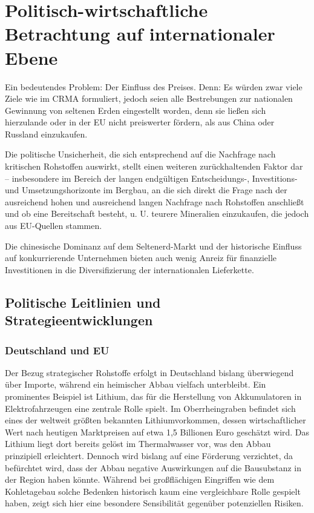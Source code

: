 \documentclass[12pt,a4paper,oneside]{book} %
\begin{document}

\chapter{Politisch-wirtschaftliche Betrachtung auf internationaler Ebene}


Ein bedeutendes Problem: Der Einfluss des Preises. Denn: Es würden zwar viele Ziele wie im CRMA formuliert, jedoch seien alle Bestrebungen zur nationalen Gewinnung von seltenen Erden eingestellt worden, denn sie ließen sich \glqq hierzulande oder in der EU nicht preiswerter fördern, als aus China oder Russland einzukaufen\grqq.\autocite{VDI Nachrichten: Seltene Erden: Deutschland importiert lieber, als selbst zu fördern}

Die politische Unsicherheit, die sich entsprechend auf die Nachfrage nach kritischen Rohstoffen auswirkt, stellt einen weiteren zurückhaltenden Faktor dar -- insbesondere im Bereich der langen endgültigen Entscheidungs-, Investitions- und Umsetzungshorizonte im Bergbau, an die sich direkt die Frage nach der ausreichend hohen und ausreichend langen Nachfrage nach Rohstoffen anschließt und ob eine Bereitschaft besteht, u. U. teurere Mineralien einzukaufen, die jedoch aus EU-Quellen stammen.

Die chinesische Dominanz auf dem Seltenerd-Markt und der historische Einfluss auf konkurrierende Unternehmen bieten auch wenig Anreiz für finanzielle Investitionen in die Diversifizierung der internationalen Lieferkette.

\section{Politische Leitlinien und Strategieentwicklungen}

\subsection{Deutschland und EU}

Der Bezug strategischer Rohstoffe erfolgt in Deutschland bislang überwiegend über Importe, während ein heimischer Abbau vielfach unterbleibt. Ein prominentes Beispiel ist Lithium, das für die Herstellung von Akkumulatoren in Elektrofahrzeugen eine zentrale Rolle spielt. Im Oberrheingraben befindet sich eines der weltweit größten bekannten Lithiumvorkommen, dessen wirtschaftlicher Wert nach heutigen Marktpreisen auf etwa 1,5 Billionen Euro geschätzt wird. Das Lithium liegt dort bereits gelöst im Thermalwasser vor, was den Abbau prinzipiell erleichtert. Dennoch wird bislang auf eine Förderung verzichtet, da befürchtet wird, dass der Abbau negative Auswirkungen auf die Bausubstanz in der Region haben könnte. Während bei großflächigen Eingriffen wie dem Kohletagebau solche Bedenken historisch kaum eine vergleichbare Rolle gespielt haben, zeigt sich hier eine besondere Sensibilität gegenüber potenziellen Risiken.
\end{document}
